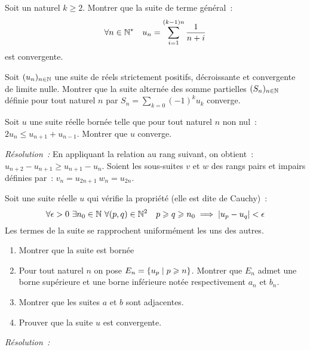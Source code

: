 \begin{exercice}
    Soit un naturel \(k \geqslant 2\). Montrer que la suite de terme général~:
    \[ \forall n \in \mathbb{N}^* \quad u_n = \sum_{i = 1}^{(k-1)n} \frac{1}{n+i} \]
    est convergente.
\end{exercice}
\begin{exercice}
    Soit \((u_n)_{n \in \mathbb{N}}\) une suite de réels strictement positifs, décroissante et convergente de limite nulle. Montrer que la suite alternée des somme partielles \((S_n)_{n\in\mathbb{N}}\) définie pour tout naturel \(n\) par \(S_n = \sum_{k = 0} (-1)^k u_k\) converge.
\end{exercice}
\begin{exercice}
    Soit \(u\) une suite réelle bornée telle que pour tout naturel \(n\) non nul~: \(2u_n \leqslant u_{n+1} + u_{n-1} \). Montrer que \(u\) converge.
\end{exercice}
\emph{Résolution~:}
En appliquant la relation au rang suivant, on obtient~: \(u_{n+2} - u_{n+1} \geqslant u_{n+1} - u_n\). Soient les sous-suites \(v\) et \(w\) des rangs pairs et impairs définies par~: \(v_n = u_{2n+1} \ w_n = u_{2n}\).
\begin{exercice}
    Soit une suite réelle \(u\) qui vérifie la propriété (elle est dite de Cauchy)~:
    \[ \forall \epsilon > 0 \ \exists n_0 \in \N \ \forall (p,q) \in \N^2 \quad p \geqslant q \geqslant n_0 \implies \abs{u_p-u_q} < \epsilon \]
    Les termes de la suite se rapprochent uniformément les uns des autres.
    \begin{enumerate}
        \item Montrer que la suite est bornée
        \item Pour tout naturel \(n\) on pose \(E_n = \left\{u_p\mathrel{}\middle|\mathrel{}p\geqslant n\right\}\). Montrer que \(E_n\) admet une borne supérieure et une borne inférieure notée respectivement \(a_n\) et \(b_n\).
        \item Montrer que les suites \(a\) et \(b\) sont adjacentes.
        \item Prouver que la suite \(u\) est convergente.
    \end{enumerate}
\end{exercice}
\emph{Résolution~:}
